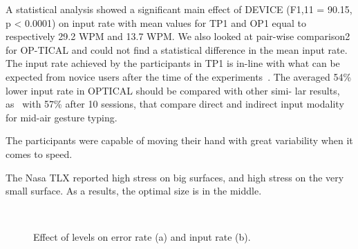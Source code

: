 \documentclass{chi-ext}
\begin{document}
A statistical analysis showed a significant main effect of DEVICE (F1,11 = 90.15, p < 0.0001) on input rate with mean values for TP1 and OP1 equal to respectively 29.2 WPM and 13.7 WPM. We also looked at pair-wise comparison2 for OP-TICAL and could not find a statistical difference in the mean input rate. The input rate achieved by the participants in TP1 is in-line with what can be expected from novice users after the time of the experiments~\cite{Kristensson2004}. The averaged 54\% lower input rate in OPTICAL should be compared with other simi- lar results, as~\cite{Markussen2014} with 57\% after 10 sessions, that compare direct and indirect input modality for mid-air gesture typing.

The participants were capable of moving their hand with great variability when it comes to speed.

The Nasa TLX reported high stress on big surfaces, and high stress on the very small surface. As a results, the optimal size is in the middle.

\begin{figure}
\centering     %
{}
\caption{Effect of levels on error rate (a) and input rate (b).}~\label{fig:effect_shape}
\end{figure}
\end{document}
